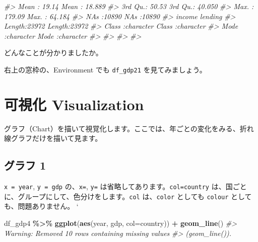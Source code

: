 \documentclass[
  xelatex, ja=standard]{bxjsbook}
\newenvironment{Shaded}{\begin{snugshade}}{\end{snugshade}}
\newcommand{\AttributeTok}[1]{\textcolor[rgb]{0.13,0.29,0.53}{#1}}
\newcommand{\CommentTok}[1]{\textcolor[rgb]{0.56,0.35,0.01}{\textit{#1}}}
\newcommand{\FunctionTok}[1]{\textcolor[rgb]{0.13,0.29,0.53}{\textbf{#1}}}
\newcommand{\NormalTok}[1]{#1}
\newcommand{\SpecialCharTok}[1]{\textcolor[rgb]{0.81,0.36,0.00}{\textbf{#1}}}
\theoremstyle{definition}
\theoremstyle{definition}
\theoremstyle{definition}
\theoremstyle{definition}
\theoremstyle{remark}
\begin{document}
\begin{Shaded}
\begin{Highlighting}[]
\CommentTok{\#\textgreater{}                     Mean   :  19.14   Mean   : 18.889  }
\CommentTok{\#\textgreater{}                     3rd Qu.:  50.53   3rd Qu.: 40.050  }
\CommentTok{\#\textgreater{}                     Max.   : 179.09   Max.   : 64.184  }
\CommentTok{\#\textgreater{}                     NA\textquotesingle{}s   :10890     NA\textquotesingle{}s   :10890    }
\CommentTok{\#\textgreater{}     income            lending         }
\CommentTok{\#\textgreater{}  Length:23972       Length:23972      }
\CommentTok{\#\textgreater{}  Class :character   Class :character  }
\CommentTok{\#\textgreater{}  Mode  :character   Mode  :character  }
\CommentTok{\#\textgreater{}                                       }
\CommentTok{\#\textgreater{}                                       }
\CommentTok{\#\textgreater{}                                       }
\CommentTok{\#\textgreater{} }
\end{Highlighting}
\end{Shaded}

どんなことが分かりましたか。

右上の窓枠の、Environment でも \texttt{df\_gdp21} を見てみましょう。

\hypertarget{ux53efux8996ux5316-visualization}{%
\section{可視化 Visualization}\label{ux53efux8996ux5316-visualization}}

グラフ（Chart）を描いて視覚化します。ここでは、年ごとの変化をみる、折れ線グラフだけを描いて見ます。

\hypertarget{ux30b0ux30e9ux30d5-1}{%
\subsection{グラフ 1}\label{ux30b0ux30e9ux30d5-1}}

\texttt{x\ =\ year}, \texttt{y\ =\ gdp} の、\texttt{x=}, \texttt{y=} は省略してあります。\texttt{col=country} は、国ごとに、グループにして、色分けをします。\texttt{col} は、\texttt{color} としても \texttt{colour} としても、問題ありません。 `

\begin{Shaded}
\begin{Highlighting}[]
\NormalTok{df\_gdp4 }\SpecialCharTok{\%\textgreater{}\%} \FunctionTok{ggplot}\NormalTok{(}\FunctionTok{aes}\NormalTok{(year, gdp, }\AttributeTok{col=}\NormalTok{country)) }\SpecialCharTok{+} \FunctionTok{geom\_line}\NormalTok{()}
\CommentTok{\#\textgreater{} Warning: Removed 10 rows containing missing values}
\CommentTok{\#\textgreater{} (\textasciigrave{}geom\_line()\textasciigrave{}).}
\end{Highlighting}
\end{Shaded}
\end{document}
